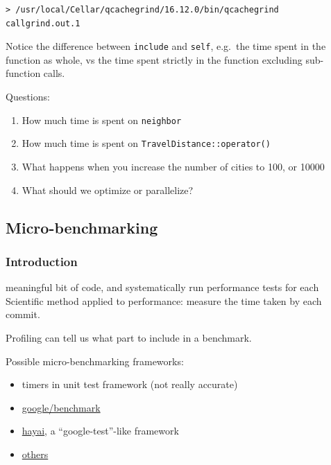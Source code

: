\begin{verbatim}
> /usr/local/Cellar/qcachegrind/16.12.0/bin/qcachegrind callgrind.out.1
\end{verbatim}

Notice the difference between \texttt{include} and \texttt{self},
e.g.~the time spent in the function as whole, vs the time spent strictly
in the function excluding sub-function calls.

Questions:

\begin{enumerate}
\def\labelenumi{\arabic{enumi}.}
\itemsep1pt\parskip0pt
\item
  How much time is spent on \texttt{neighbor}
\item
  How much time is spent on \texttt{TravelDistance::operator()}
\item
  What happens when you increase the number of cities to 100, or 10000
\item
  What should we optimize or parallelize?
\end{enumerate}

\subsection{Micro-benchmarking}\label{micro-benchmarking}

\subsubsection{Introduction}\label{introduction-5}

meaningful bit of code, and systematically run performance tests for
each Scientific method applied to performance: measure the time taken by
each commit.

Profiling can tell us what part to include in a benchmark.

Possible micro-benchmarking frameworks:

\begin{itemize}
\itemsep1pt\parskip0pt
\item
  timers in unit test framework (not really accurate)
\item
  \href{https://github.com/google/benchmark}{google/benchmark}
\item
  \href{https://github.com/nickbruun/hayai}{hayai}, a
  ``google-test''-like framework
\item
  \href{http://www.bfilipek.com/2016/01/micro-benchmarking-libraries-for-c.html}{others}
\end{itemize}


